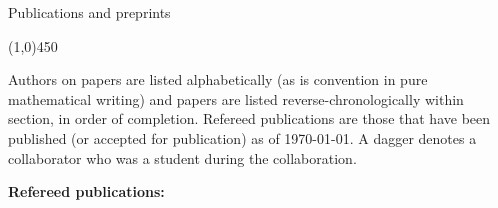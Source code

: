 \documentclass[10pt]{article}
\begin{document}
\bigskip
\noindent
{\large \sc Publications and preprints}

\vspace{-0.1in}
\noindent
\line(1,0){450}

\smallskip

\noindent Authors on papers are listed alphabetically (as is convention in pure mathematical writing)
and papers are listed reverse-chronologically within section, in order of completion.
Refereed publications are those that have been published 
(or accepted for publication) as of \today.
A dagger\textsuperscript{\textdagger} denotes a collaborator who was a student during the collaboration.

\medskip

\noindent\textbf{Refereed publications:}
\end{document}
